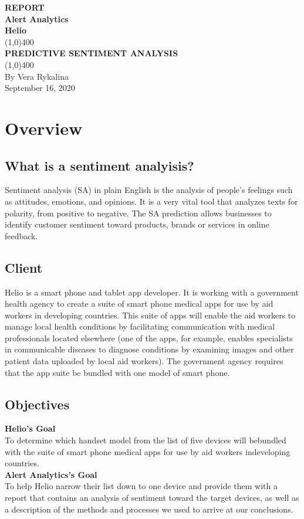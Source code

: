 \documentclass[12]{article}
\begin{document}
\begin{titlepage}
\begin{center}
\vspace*{1cm}
\Large{\textbf{\MakeUppercase {Report}}}\\[3mm]
\Large{\textbf{Alert Analytics}}\\
\Large{\textbf{Helio}}\\
\vfill
\line(1,0){400}\\[5mm]
\Large{\textbf{\MakeUppercase{Predictive Sentiment Analysis}}}\\ [1mm]
\line(1,0){400}\\[2mm]
\vfill
By Vera Rykalina\\
September 16, 2020\\
\end{center}
\end{titlepage}
\tableofcontents
\thispagestyle{empty}
\clearpage
\setcounter{page}{1}

\section{Overview}
\subsection{What is  a sentiment analyisis?}
Sentiment analysis (SA) in plain English is the analysis of people's feelings such as attitudes, emotions, and opinions. It is a very vital tool that analyzes texts for polarity, from positive to negative. The SA prediction allows businesses to identify customer sentiment toward products, brands or services in online feedback.
\subsection{Client}
Helio is a smart phone and tablet app developer. It is working with a government health agency to create a suite of smart phone medical apps for use by aid workers in developing countries. This suite of apps will enable the aid workers to manage local health conditions by facilitating communication with medical professionals located elsewhere (one of the apps, for example, enables specialists in communicable diseases to diagnose conditions by examining images and other patient data uploaded by local aid workers). The government agency requires that the app suite be bundled with one model of smart phone.
\subsection{Objectives}
\textbf{Helio's Goal}\\
To determine which handset model from the list of five devices will bebundled with the suite of smart phone medical apps for use by aid workers indeveloping countries.\\
\textbf{Alert Analytics's Goal}\\
To help Helio narrow their list down to one device and provide them with a report that contains an analysis of sentiment toward the target devices, as well as a description of the methods and processes we used to arrive at our conclusions.
\end{document}
